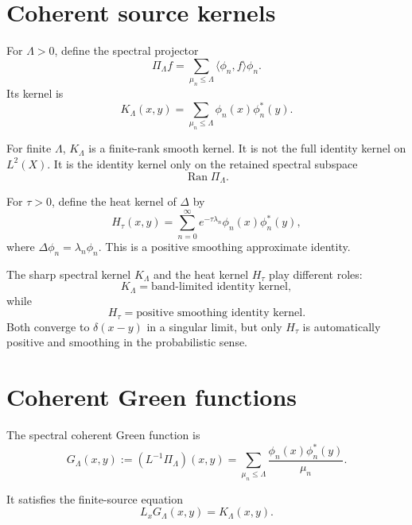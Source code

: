 \documentclass[11pt]{article}
\begin{document}
\section{Coherent source kernels}

\begin{definition}
For \(\Lambda>0\), define the spectral projector
\[
\Pi_\Lambda f=\sum_{\mu_n\le \Lambda}\langle \phi_n,f\rangle\phi_n.
\]
Its kernel is
\begin{equation}
K_\Lambda(x,y)=\sum_{\mu_n\le \Lambda}\phi_n(x)\phi_n^*(y).
\end{equation}
\end{definition}

For finite \(\Lambda\), \(K_\Lambda\) is a finite-rank smooth kernel. It is not the full identity kernel on \(L^2(X)\). It is the identity kernel only on the retained spectral subspace
\[
\operatorname{Ran}\Pi_\Lambda.
\]

\begin{definition}
For \(\tau>0\), define the heat kernel of \(\Delta\) by
\[
H_\tau(x,y)=\sum_{n=0}^\infty e^{-\tau \lambda_n}\phi_n(x)\phi_n^*(y),
\]
where \(\Delta\phi_n=\lambda_n\phi_n\). This is a positive smoothing approximate identity.
\end{definition}

The sharp spectral kernel \(K_\Lambda\) and the heat kernel \(H_\tau\) play different roles:
\[
K_\Lambda=\text{band-limited identity kernel},
\]
while
\[
H_\tau=\text{positive smoothing identity kernel}.
\]
Both converge to \(\delta(x-y)\) in a singular limit, but only \(H_\tau\) is automatically positive and smoothing in the probabilistic sense.

\section{Coherent Green functions}

\begin{definition}
The spectral coherent Green function is
\begin{equation}
G_\Lambda(x,y):=(L^{-1}\Pi_\Lambda)(x,y)
=\sum_{\mu_n\le \Lambda}\frac{\phi_n(x)\phi_n^*(y)}{\mu_n}.
\end{equation}
\end{definition}

It satisfies the finite-source equation
\begin{equation}
L_xG_\Lambda(x,y)=K_\Lambda(x,y).
\end{equation}
\end{document}
